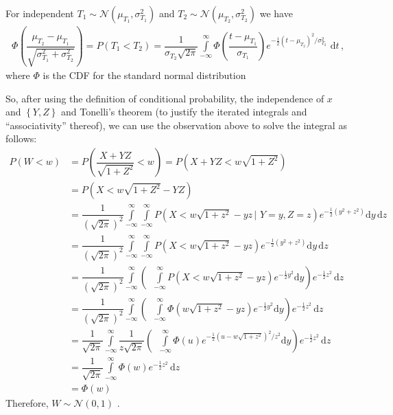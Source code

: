 \begin{solution}
\begin{framed}
For independent \(T_1\sim\mathcal{N}(\mu_{T_1} , \sigma_{T_1}^2)\) and \(T_2\sim\mathcal{N}(\mu_{T_2} , \sigma_{T_2}^2)\)  we have
\begin{align}
    \Phi\left(\dfrac{\mu_{T_2}-\mu_{T_1}}{\sqrt{\sigma_{T_1}^2{}+{}\sigma_{T_2}^2}}\right){}={}P\left(T_1<T_2\right){}={}\displaystyle\dfrac{1}{\sigma_{T_2}\sqrt{2\pi}}\int\limits_{{-}\infty}^{\infty}{}\Phi\left(\dfrac{t-\mu_{T_1}}{\sigma_{T_1}}\right)e^{-\frac{1}{2}\left(t-\mu_{T_2}\right)^2/\sigma^2_{T_2}}\,\,\mathrm dt\,,
\end{align}
where \(\Phi\)  is the CDF for the standard normal distribution
\end{framed}
So, after using the definition of conditional probability, the independence of \(x\)  and \(\left\{Y, Z\right\}\)  and Tonelli's theorem (to justify the iterated integrals and ``associativity'' thereof), we can use the observation above to solve the integral as follows:
\begin{align*}
P\left(W<w\right)&=P\left(\dfrac{X+YZ}{\sqrt{1+Z^2}}<w\right)=P\left(X+YZ<w\sqrt{1+Z^2}\right)\\
&=P\left(X<w\sqrt{1+Z^2}-YZ\right)\\
&=\dfrac{1}{\left(\sqrt{2\pi}\right)^2}\int\limits^{\infty}_{{-}\infty}\int\limits^{\infty}_{{-}\infty} P\left(X<w\sqrt{1+z^2}-yz\,\bigg|\,\,Y=y,Z=z\right)e^{-\frac{1}{2}\left(y^2+z^2\right)}\mathrm dy\,\mathrm dz\\
&=\dfrac{1}{\left(\sqrt{2\pi}\right)^2}\int\limits^{\infty}_{{-}\infty}\int\limits^{\infty}_{{-}\infty} P\left(X<w\sqrt{1+z^2}-yz\right)e^{-\frac{1}{2}\left(y^2+z^2\right)}\mathrm dy\,\mathrm dz\\
&=\dfrac{1}{\left(\sqrt{2\pi}\right)^2}\int\limits^{\infty}_{{-}\infty}\left(\,\,\,\int\limits^{\infty}_{{-}\infty} P\left(X<w\sqrt{1+z^2}-yz\right)e^{-\frac{1}{2}y^2}\mathrm dy\right)e^{-\frac{1}{2}z^2}\,\mathrm dz\\
&=\dfrac{1}{\left(\sqrt{2\pi}\right)^2}\int\limits^{\infty}_{{-}\infty}\left(\,\,\,\int\limits^{\infty}_{{-}\infty} \Phi\left(w\sqrt{1+z^2}-yz\right)e^{-\frac{1}{2}y^2}\mathrm dy\right)e^{-\frac{1}{2}z^2}\,\mathrm dz\\
&=\dfrac{1}{\sqrt{2\pi}}\int\limits^{\infty}_{{-}\infty}\dfrac{1}{z\sqrt{2\pi}}\left(\,\,\,\int\limits^{\infty}_{{-}\infty} \Phi\left(u\right)e^{-\frac{1}{2}\left(u-w\sqrt{1+z^2}\right)^2/z^2}\mathrm dy\right)e^{-\frac{1}{2}z^2}\,\mathrm dz\\
&=\dfrac{1}{\sqrt{2\pi}}\int\limits^{\infty}_{{-}\infty} \Phi\left(w\right)e^{-\frac{1}{2}z^2}\,\mathrm dz\\
&=\Phi\left(w\right)\,
\end{align*}
Therefore, \(W\sim\mathcal{N}\left(0,1\right)\) .
\end{solution}

